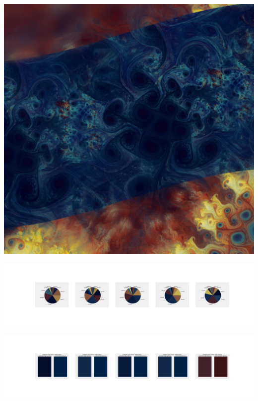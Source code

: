 \documentclass[11pt]{article}
\begin{document}
\begin{landscape}
    \begin{center}
    \includegraphics[width=\textwidth]{./nbimg/file (333).jpg}
    \end{center}

    \begin{center}
    \includegraphics[width=250mm]{./nbimg/pie-260.jpg}
    \end{center}

    \begin{center}
    \includegraphics[width=250mm]{./nbimg/peak-260.jpg}
    \end{center}
    


\end{landscape}
\end{document}

